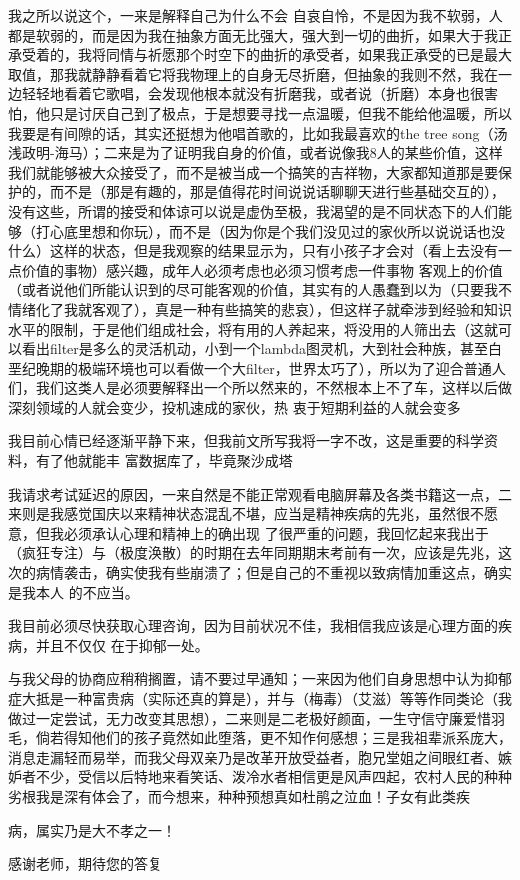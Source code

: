\documentclass{article}
\begin{document}
我之所以说这个，一来是解释自己为什么不会
\newpage
自哀自怜，不是因为我不软弱，人都是软弱的，而是因为我在抽象方面无比强大，强大到一切的曲折，如果大于我正承受着的，我将同情与祈愿那个时空下的曲折的承受者，如果我正承受的已是最大取值，那我就静静看着它将我物理上的自身无尽折磨，但抽象的我则不然，我在一边轻轻地看着它歌唱，会发现他根本就没有折磨我，或者说（折磨）本身也很害怕，他只是讨厌自己到了极点，于是想要寻找一点温暖，但我不能给他温暖，所以我要是有间隙的话，其实还挺想为他唱首歌的，比如我最喜欢的the tree song（汤浅政明-海马）；二来是为了证明我自身的价值，或者说像我8人的某些价值，这样我们就能够被大众接受了，而不是被当成一个搞笑的吉祥物，大家都知道那是要保护的，而不是（那是有趣的，那是值得花时间说说话聊聊天进行些基础交互的），没有这些，所谓的接受和体谅可以说是虚伪至极，我渴望的是不同状态下的人们能够（打心底里想和你玩），而不是（因为你是个我们没见过的家伙所以说说话也没什么）这样的状态，但是我观察的结果显示为，只有小孩子才会对（看上去没有一点价值的事物）感兴趣，成年人必须考虑也必须习惯考虑一件事物
\newpage
客观上的价值（或者说他们所能认识到的尽可能客观的价值，其实有的人愚蠢到以为（只要我不情绪化了我就客观了），真是一种有些搞笑的悲哀），但这样子就牵涉到经验和知识水平的限制，于是他们组成社会，将有用的人养起来，将没用的人筛出去（这就可以看出filter是多么的灵活机动，小到一个lambda图灵机，大到社会种族，甚至白垩纪晚期的极端环境也可以看做一个大filter，世界太巧了），所以为了迎合普通人们，我们这类人是必须要解释出一个所以然来的，不然根本上不了车，这样以后做深刻领域的人就会变少，投机速成的家伙，热
衷于短期利益的人就会变多 

我目前心情已经逐渐平静下来，但我前文所写我将一字不改，这是重要的科学资料，有了他就能丰
富数据库了，毕竟聚沙成塔 

我请求考试延迟的原因，一来自然是不能正常观看电脑屏幕及各类书籍这一点，二来则是我感觉国庆以来精神状态混乱不堪，应当是精神疾病的先兆，虽然很不愿意，但我必须承认心理和精神上的确出现
\newpage
了很严重的问题，我回忆起来我出于（疯狂专注）与（极度涣散）的时期在去年同期期末考前有一次，应该是先兆，这次的病情袭击，确实使我有些崩溃了；但是自己的不重视以致病情加重这点，确实是我本人
的不应当。 

我目前必须尽快获取心理咨询，因为目前状况不佳，我相信我应该是心理方面的疾病，并且不仅仅
在于抑郁一处。 

与我父母的协商应稍稍搁置，请不要过早通知；一来因为他们自身思想中认为抑郁症大抵是一种富贵病（实际还真的算是），并与（梅毒）（艾滋）等等作同类论（我做过一定尝试，无力改变其思想），二来则是二老极好颜面，一生守信守廉爱惜羽毛，倘若得知他们的孩子竟然如此堕落，更不知作何感想；三是我祖辈派系庞大，消息走漏轻而易举，而我父母双亲乃是改革开放受益者，胞兄堂姐之间眼红者、嫉妒者不少，受信以后特地来看笑话、泼冷水者相信更是风声四起，农村人民的种种劣根我是深有体会了，而今想来，种种预想真如杜鹃之泣血！子女有此类疾
\newpage

病，属实乃是大不孝之一！ 

感谢老师，期待您的答复
\end{document}
